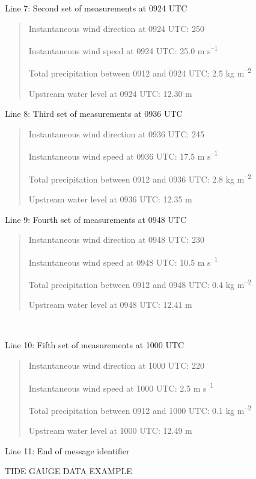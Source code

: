 Line 7: Second set of measurements at 0924 UTC

\begin{quote}
Instantaneous wind direction at 0924 UTC: 250

Instantaneous wind speed at 0924 UTC: 25.0 m s\textsuperscript{--1}

Total precipitation between 0912 and 0924 UTC: 2.5 kg m\textsuperscript{--2}

Upstream water level at 0924 UTC: 12.30 m
\end{quote}

Line 8: Third set of measurements at 0936 UTC

\begin{quote}
Instantaneous wind direction at 0936 UTC: 245

Instantaneous wind speed at 0936 UTC: 17.5 m s\textsuperscript{--1}

Total precipitation between 0912 and 0936 UTC: 2.8 kg m\textsuperscript{--2}

Upstream water level at 0936 UTC: 12.35 m
\end{quote}

Line 9: Fourth set of measurements at 0948 UTC

\begin{quote}
Instantaneous wind direction at 0948 UTC: 230

Instantaneous wind speed at 0948 UTC: 10.5 m s\textsuperscript{--1}

Total precipitation between 0912 and 0948 UTC: 0.4 kg m\textsuperscript{--2}

Upstream water level at 0948 UTC: 12.41 m
\end{quote}

\emph{\textbf{\\
}}

Line 10: Fifth set of measurements at 1000 UTC

\begin{quote}
Instantaneous wind direction at 1000 UTC: 220

Instantaneous wind speed at 1000 UTC: 2.5 m s\textsuperscript{--1}

Total precipitation between 0912 and 1000 UTC: 0.1 kg m\textsuperscript{--2}

Upstream water level at 1000 UTC: 12.49 m
\end{quote}

Line 11: End of message identifier

TIDE GAUGE DATA EXAMPLE

